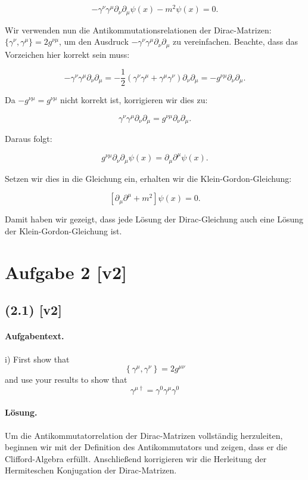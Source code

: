\documentclass[11pt,a4paper]{article}
\begin{document}
\[
-\gamma^\nu \gamma^\mu \partial_\nu \partial_\mu \psi(x) - m^2 \psi(x) = 0.
\]

Wir verwenden nun die Antikommutationsrelationen der Dirac-Matrizen: \(\{\gamma^\nu, \gamma^\mu\} = 2g^{\nu\mu}\), um den Ausdruck \(-\gamma^\nu \gamma^\mu \partial_\nu \partial_\mu\) zu vereinfachen. Beachte, dass das Vorzeichen hier korrekt sein muss:

\[
-\gamma^\nu \gamma^\mu \partial_\nu \partial_\mu = -\frac{1}{2} \left(\gamma^\nu \gamma^\mu + \gamma^\mu \gamma^\nu\right) \partial_\nu \partial_\mu = -g^{\nu\mu} \partial_\nu \partial_\mu.
\]

Da \(-g^{\nu\mu} = g^{\nu\mu}\) nicht korrekt ist, korrigieren wir dies zu:

\[
\gamma^\nu \gamma^\mu \partial_\nu \partial_\mu = g^{\nu\mu} \partial_\nu \partial_\mu.
\]

Daraus folgt:

\[
g^{\nu\mu} \partial_\nu \partial_\mu \psi(x) = \partial_\mu \partial^\mu \psi(x).
\]

Setzen wir dies in die Gleichung ein, erhalten wir die Klein-Gordon-Gleichung:

\[
\left[\partial_\mu \partial^\mu + m^2\right] \psi(x) = 0.
\]

Damit haben wir gezeigt, dass jede Lösung der Dirac-Gleichung auch eine Lösung der Klein-Gordon-Gleichung ist.


\section*{Aufgabe 2 [v2]}
\subsection*{(2.1) [v2]}
\paragraph{Aufgabentext.}
i) First show that
$$
\left\{\gamma^\mu, \gamma^\nu\right\}=2 g^{\mu \nu}
$$
and use your results to show that
$$
\gamma^{\mu \dagger}=\gamma^0 \gamma^\mu \gamma^0
$$

\paragraph{Lösung.}
Um die Antikommutatorrelation der Dirac-Matrizen vollständig herzuleiten, beginnen wir mit der Definition des Antikommutators und zeigen, dass er die Clifford-Algebra erfüllt. Anschließend korrigieren wir die Herleitung der Hermiteschen Konjugation der Dirac-Matrizen.
\end{document}
